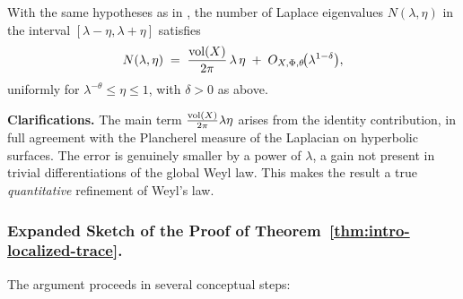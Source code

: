 \medskip

\begin{theorem}\label{thm:intro-local-weyl}
With the same hypotheses as in , the number of Laplace eigenvalues $N(\lambda,\eta)$ in the interval $[\lambda-\eta,\lambda+\eta]$ satisfies
\[
  N(\lambda,\eta)
  \;=\;
  \frac{\operatorname{vol}(X)}{2\pi}\,\lambda\,\eta
  \;+\;
  O_{X,\Phi,\theta}\!\big(\lambda^{1-\delta}\big),
\]
uniformly for $\lambda^{-\theta}\le \eta\le 1$, with $\delta>0$ as above. 
\end{theorem}

\medskip

\noindent\textbf{Clarifications.}
The main term $\frac{\operatorname{vol}(X)}{2\pi}\lambda\eta$ arises from the identity contribution, 
in full agreement with the Plancherel measure of the Laplacian on hyperbolic surfaces. 
The error is genuinely smaller by a power of $\lambda$, a gain not present in trivial differentiations of the global Weyl law. 
This makes the result a true \emph{quantitative} refinement of Weyl’s law.

\medskip

\subsubsection*{Expanded Sketch of the Proof of Theorem~\ref{thm:intro-localized-trace}.}
The argument proceeds in several conceptual steps:


